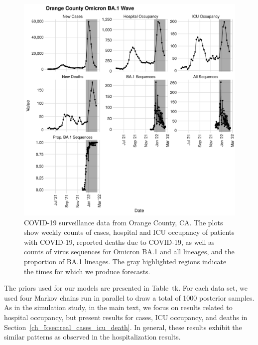 \begin{figure}
    \centering
    \includegraphics[width=1.0\columnwidth]{orange_county_binned_data_plot.pdf}
    \caption[COVID-19 surveillance data from Orange County, California.]{
COVID-19 surveillance data from Orange County, CA.
The plots show weekly counts of cases, hospital and ICU occupancy of patients with COVID-19, reported deaths due to COVID-19, as well as counts of virus sequences for Omicron BA.1 and all lineages, and the proportion of BA.1 lineages.
The gray highlighted regions indicate the times for which we produce forecasts.}
    \label{ch_5:fig:orange_county_binned_data_plot}
\end{figure}

The priors used for our models are presented in Table~tk.
For each data set, we used four Markov chains run in parallel to draw a total of 1000 posterior samples.
As in the simulation study, in the main text, we focus on results related to hospital occupancy, but present results for cases, ICU occupancy, and deaths in Section~\ref{ch_5:sec:real_cases_icu_death}.
In general, these results exhibit the similar patterns as observed in the hospitalization results.

